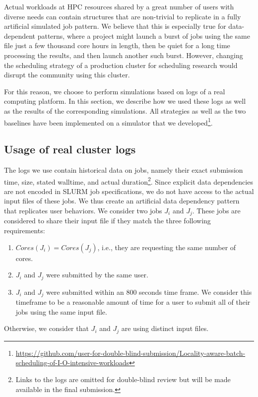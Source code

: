 \documentclass[conference,10pt]{IEEEtran}
\newcommand{\core}{\mathit{Cores}\xspace}
\begin{document}
Actual workloads at HPC resources shared by a great number of users with diverse needs can contain structures
that are non-trivial to replicate in a fully artificial simulated job pattern. We believe that this is especially
true for data-dependent patterns, where a project might launch a burst of jobs using the same file just a few thousand
core hours in length, then be quiet for a long time processing the results, and then launch another such burst.
However, changing the scheduling strategy of a production cluster for
scheduling research would disrupt the community using this cluster.


For this reason, we choose to perform simulations based on logs of a
real computing platform. In this section, we describe how we used
these logs as well as the results of the corresponding simulations.
All strategies as well as the two baselines have been implemented on
a simulator that we developed\footnote{\url{https://github.com/user-for-double-blind-submission/Locality-aware-batch-scheduling-of-I-O-intensive-workloads}}.



\subsection{Usage of real cluster logs}
\label{sec.working}

The logs we use contain historical data on jobs, namely their exact submission time,
size, stated walltime, and actual duration\footnote{Links to the logs
  are omitted for double-blind review but will be made
  available in the final submission.}. 
Since explicit data dependencies are not encoded in SLURM job
specifications, we do not have access to the actual input files of
these jobs. We thus create an artificial data dependency pattern that
replicates user behaviors.
We consider two jobs $J_i$ and $J_j$. These jobs are considered to
share their input file if they match the three following requirements:
\begin{enumerate}
	\item $\core(J_i) = \core(J_j)$, i.e., they are requesting the same number of cores.
	\item $J_i$ and $J_j$ were submitted by the same user.
	\item $J_i$ and $J_j$ were submitted within an 800 seconds
          time frame. We consider this timeframe to be a reasonable amount of time for a user to submit all of their jobs using the same input file.
\end{enumerate}
Otherwise, we consider that $J_i$ and $J_j$ are using distinct input files.
\end{document}
